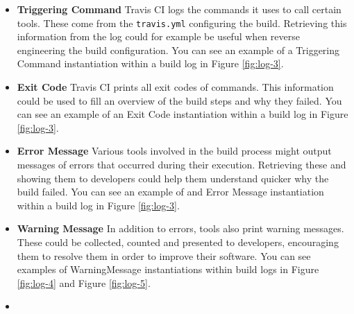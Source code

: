 \documentclass[\myrootdir/main.tex]{subfiles}
\begin{document}
\begin{itemize}
	\item \textbf{Triggering Command} Travis CI logs the commands it uses to call certain tools.
	These come from the \texttt{travis.yml} configuring the build.
	Retrieving this information from the log could for example be useful when reverse engineering the build configuration.
	You can see an example of a Triggering Command instantiation within a build log in Figure \ref{fig:log-3}.

	\item \textbf{Exit Code} Travis CI prints all exit codes of commands.
	This information could be used to fill an overview of the build steps and why they failed.
	You can see an example of an Exit Code instantiation within a build log in Figure \ref{fig:log-3}.

	\item \textbf{Error Message} Various tools involved in the build process might output messages of errors that occurred during their execution.
	Retrieving these and showing them to developers could help them understand quicker why the build failed.
	You can see an example of and Error Message instantiation within a build log in Figure \ref{fig:log-3}.

	\item \textbf{Warning Message} In addition to errors, tools also print warning messages.
	These could be collected, counted and presented to developers, encouraging them to resolve them in order to improve their software.
	You can see examples of WarningMessage instantiations within build logs in Figure \ref{fig:log-4} and Figure \ref{fig:log-5}.

	\item {}
\end{itemize}
\end{document}
